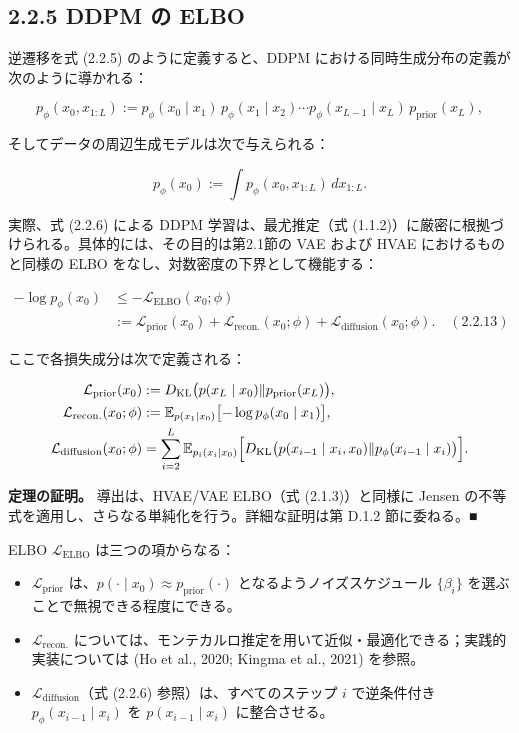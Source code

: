 \subsection*{2.2.5 DDPM の ELBO}


逆遷移を式 (2.2.5) のように定義すると、DDPM における同時生成分布の定義が次のように導かれる：

\[
p_\phi(x_0,x_{1:L}) := p_\phi(x_0\mid x_1)\, p_\phi(x_1\mid x_2)\cdots p_\phi(x_{L-1}\mid x_L)\, p_{\mathrm{prior}}(x_L),
\]


そしてデータの周辺生成モデルは次で与えられる：

\[
p_\phi(x_0) := \int p_\phi(x_0,x_{1:L})\, dx_{1:L}.
\]


実際、式 (2.2.6) による DDPM 学習は、最尤推定（式 (1.1.2)）に厳密に根拠づけられる。具体的には、その目的は第2.1節の VAE および HVAE におけるものと同様の ELBO をなし、対数密度の下界として機能する：

\begin{propositionbox}
\[
\begin{aligned}
-\log p_\phi(x_0) &\le -\mathcal{L}_{\mathrm{ELBO}}(x_0;\phi) \\
&:= \mathcal{L}_{\mathrm{prior}}(x_0) + \mathcal{L}_{\mathrm{recon.}}(x_0;\phi) + \mathcal{L}_{\mathrm{diffusion}}(x_0;\phi). \quad (2.2.13)
\end{aligned}
\]

ここで各損失成分は次で定義される：

\[
\begin{aligned}
\mathcal{L}_{\mathrm{prior}}(x_0) &:= D_{\mathrm{KL}}\bigl(p(x_L\mid x_0)\Vert p_{\mathrm{prior}}(x_L)\bigr), \\
\mathcal{L}_{\mathrm{recon.}}(x_0;\phi) &:= \mathbb{E}_{p(x_1\mid x_0)}\bigl[-\log p_\phi(x_0\mid x_1)\bigr], \\
\mathcal{L}_{\mathrm{diffusion}}(x_0;\phi) &= \sum_{i=2}^{L}\mathbb{E}_{p_i(x_i\mid x_0)}\Bigl[D_{\mathrm{KL}}\bigl(p(x_{i-1}\mid x_i,x_0)\Vert p_\phi(x_{i-1}\mid x_i)\bigr)\Bigr].
\end{aligned}
\]
\end{propositionbox}


\textbf{定理の証明。}
導出は、HVAE/VAE ELBO（式 (2.1.3)）と同様に Jensen の不等式を適用し、さらなる単純化を行う。詳細な証明は第 D.1.2 節に委ねる。■

ELBO $\mathcal{L}_{\mathrm{ELBO}}$ は三つの項からなる：

\begin{itemize}
\item $\mathcal{L}_{\mathrm{prior}}$ は、$p(\cdot\mid x_0)\approx p_{\mathrm{prior}}(\cdot)$ となるようノイズスケジュール $\{\beta_i\}$ を選ぶことで無視できる程度にできる。
\item $\mathcal{L}_{\mathrm{recon.}}$ については、モンテカルロ推定を用いて近似・最適化できる；実践的実装については (Ho et al., 2020; Kingma et al., 2021) を参照。
\item $\mathcal{L}_{\mathrm{diffusion}}$（式 (2.2.6) 参照）は、すべてのステップ $i$ で逆条件付き $p_\phi(x_{i-1}\mid x_i)$ を $p(x_{i-1}\mid x_i)$ に整合させる。
\end{itemize}


